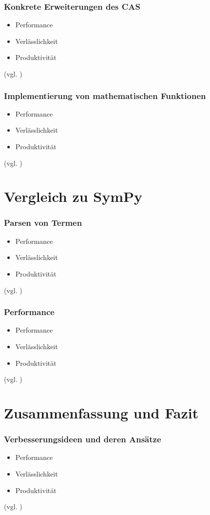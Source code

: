 \documentclass{beamer}
\begin{document}
\begin{frame}[fragile]
  \frametitle{Konkrete Erweiterungen des CAS}
  \begin{itemize}
    \item Performance
    \pause
    \item Verlässlichkeit
    \pause
    \item Produktivität
  \end{itemize}
  {\small (vgl. \cite{WhyRust})}
\end{frame}

\begin{frame}[fragile]
  \frametitle{Implementierung von mathematischen Funktionen}
  \begin{itemize}
    \item Performance
    \pause
    \item Verlässlichkeit
    \pause
    \item Produktivität
  \end{itemize}
  {\small (vgl. \cite{WhyRust})}
\end{frame}

\section{Vergleich zu SymPy}
\begin{frame}[fragile]
  \frametitle{Parsen von Termen}
  \begin{itemize}
    \item Performance
    \pause
    \item Verlässlichkeit
    \pause
    \item Produktivität
  \end{itemize}
  {\small (vgl. \cite{WhyRust})}
\end{frame}

\begin{frame}[fragile]
  \frametitle{Performance}
  \begin{itemize}
    \item Performance
    \pause
    \item Verlässlichkeit
    \pause
    \item Produktivität
  \end{itemize}
  {\small (vgl. \cite{WhyRust})}
\end{frame}

\section{Zusammenfassung und Fazit}
\begin{frame}[fragile]
  \frametitle{Verbesserungsideen und deren Ansätze}
  \begin{itemize}
    \item Performance
    \pause
    \item Verlässlichkeit
    \pause
    \item Produktivität
  \end{itemize}
  {\small (vgl. \cite{WhyRust})}
\end{frame}
\end{document}
